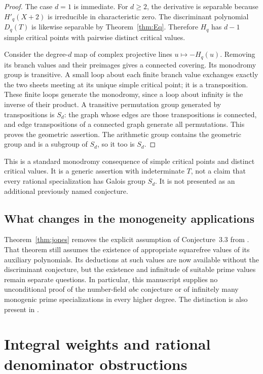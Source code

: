 \documentclass[11pt,a4paper]{article}
\theoremstyle{definition}
\theoremstyle{remark}
\begin{document}
\begin{proof}
The case $d=1$ is immediate. For $d\ge2$, the derivative is separable
because $H'_q(X+2)$ is irreducible in characteristic zero. The
discriminant polynomial $D_q(T)$ is likewise separable by
Theorem~\ref{thm:Eq}. Therefore $H_q$ has $d-1$ simple critical
points with pairwise distinct critical values.

Consider the degree-$d$ map of complex projective lines
$u\mapsto-H_q(u)$. Removing its branch values and their preimages
gives a connected covering. Its monodromy group is transitive.
A small loop about each finite branch value exchanges exactly the
two sheets meeting at its unique simple critical point; it is a
transposition. These finite loops generate the monodromy, since a
loop about infinity is the inverse of their product. A transitive
permutation group generated by transpositions is $S_d$: the graph
whose edges are those transpositions is connected, and edge
transpositions of a connected graph generate all permutations.
This proves the geometric assertion. The arithmetic group contains
the geometric group and is a subgroup of $S_d$, so it too is $S_d$.
\end{proof}

This is a standard monodromy consequence of simple critical points
and distinct critical values. It is a generic assertion with
indeterminate $T$, not a claim that every rational specialization
has Galois group $S_d$. It is not presented as an additional
previously named conjecture.

\subsection{What changes in the monogeneity applications}

Theorem~\ref{thm:jones} removes the explicit assumption of
Conjecture~3.3 from \cite[Theorem~3.4]{Jones}. That theorem still
assumes the existence of appropriate squarefree values of its
auxiliary polynomials. Its deductions at such values are now
available without the discriminant conjecture, but the existence
and infinitude of suitable prime values remain separate questions.
In particular, this manuscript supplies no unconditional proof of
the number-field $abc$ conjecture or of infinitely many monogenic
prime specializations in every higher degree. The distinction is
also present in \cite[Theorem~1.4]{BNW}.

\section{Integral weights and rational denominator obstructions}
\label{sec:integral-weights}
\end{document}
